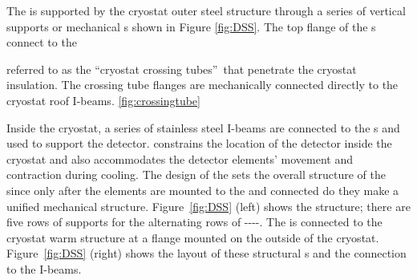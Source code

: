The  is supported by the
cryostat outer steel structure through a series of vertical supports or mechanical \fdth{}s shown in Figure \ref{fig:DSS}. The  top flange of the  \fdth{}s connect to the 

referred to as the \textquotedblleft cryostat crossing tubes\textquotedblright\   that penetrate the cryostat insulation. 
The  crossing tube flanges are mechanically connected directly to the cryostat roof I-beams. \ref{fig:crossingtube}


Inside the cryostat, a series of stainless steel I-beams are connected to the \fdth{}s and used to support the
detector. 
 constrains the location of the detector inside the cryostat and also accommodates the detector elements' movement and contraction  %
during cooling. 
The design of the  %
sets the overall
structure %
of the  since %
only after the elements are mounted to the  and connected do they make a unified mechanical structure. 
Figure~\ref{fig:DSS} (left) shows the  structure; there are
five rows of supports for the alternating rows of
----.  
The  is connected to the cryostat warm structure at a flange mounted on the outside of the cryostat.  
Figure~\ref{fig:DSS} (right)
shows the layout of these structural \fdth{}s and the connection to the I-beams.

